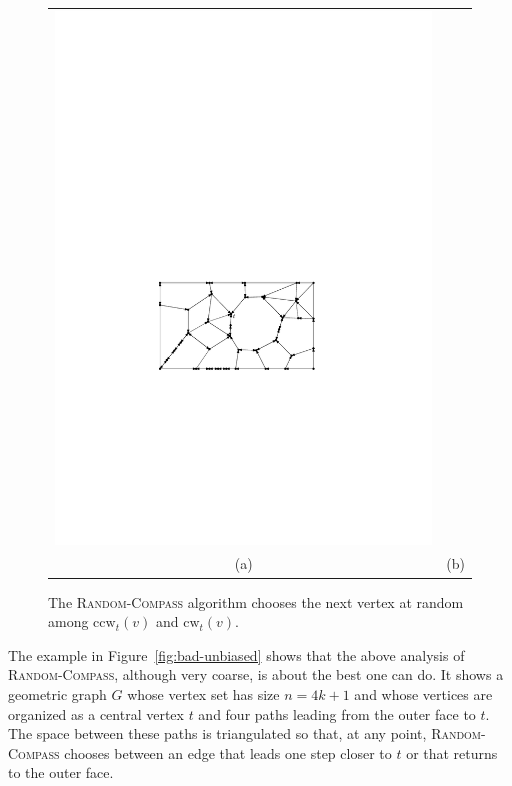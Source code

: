 \documentclass{elsarticle}
\newcommand{\ccw}{\mathrm{ccw}}
\newcommand{\cw}{\mathrm{cw}}
\begin{document}
\begin{figure}
\begin{center}
\begin{tabular}{cc}
    \includegraphics[scale=0.75]{pics/aux-graph} \\
    (a) & (b)
    \end{tabular}
  \end{center}
  \caption{The \textsc{Random-Compass} algorithm chooses the next vertex at random among $\ccw_t(v)$ and $\cw_t(v)$.}
  \label{fig:random-compass}
\end{figure}

The example in Figure~\ref{fig:bad-unbiased} shows that the above analysis of \textsc{Random-Compass}, although very coarse, is about the best one can do. It shows a geometric graph $G$ whose vertex set has size $n=4k+1$ and whose vertices are organized as a central vertex $t$ and four paths leading from the outer face to $t$.  The space between these paths is triangulated so that, at any point, \textsc{Random-Compass} chooses between an edge that leads one step closer to $t$ or that returns to the outer face.
\end{document}

